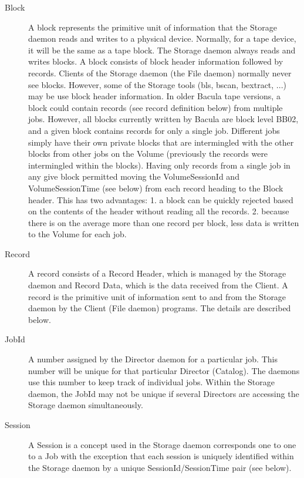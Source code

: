 \begin{description}

\item [Block]
   A block represents the primitive unit of information  that the Storage daemon
reads and writes to a physical  device. Normally, for a tape device, it will
be the same as a  tape block. The Storage daemon always reads and writes 
blocks. A block consists of block header information  followed by records.
Clients of the Storage daemon (the  File daemon) normally never see blocks.
However, some  of the Storage tools (bls, bscan, bextract, ...) may  be use
block header information. In older Bacula tape  versions, a block could
contain records (see record definition below)  from multiple  jobs. However,
all blocks currently written by Bacula are  block level BB02, and a given
block contains records for  only a single job. Different jobs simply have
their own private  blocks that are intermingled with the other blocks from
other jobs  on the Volume (previously the records were intermingled within 
the blocks). Having only records from a single job in any  give block
permitted moving the VolumeSessionId  and VolumeSessionTime (see below) from
each record heading to  the Block header. This has two advantages: 1. a block
can be  quickly rejected based on the contents of the header without  reading
all the records. 2. because there is on the average  more than one record per
block, less data is written to the  Volume for each job.  

\item [Record]
   A record consists of a Record Header, which is managed  by the Storage daemon
and Record Data, which is the data  received from the Client. A record is the
primitive unit  of information sent to and from the Storage daemon by the 
Client (File daemon) programs. The details are described below.  

\item [JobId]
   A number assigned by the Director daemon for a  particular job. This number
will be unique for  that particular Director (Catalog). The daemons use this 
number to keep track of individual jobs. Within the Storage  daemon, the JobId
may not be unique if several Directors are  accessing the Storage daemon
simultaneously.  

\item [Session]
   A Session is a concept used in the Storage daemon  corresponds one to one to a
Job with the exception that  each session is uniquely identified within the
Storage  daemon by a unique SessionId/SessionTime pair (see below).  


\end{description}
